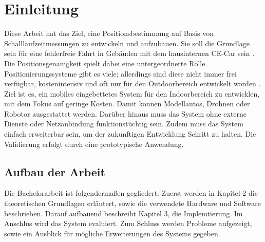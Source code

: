 \newpage
\section{Einleitung}

Diese Arbeit hat das Ziel, eine Positionsbestimmung auf Basis von Schalllaufzeitmessungen zu entwickeln und aufzubauen. Sie soll die Grundlage sein für eine fehlerfreie Fahrt in Gebäuden mit dem hausinternen CE-Car sein \cite{src_CE_CAR}. Die Positionsgenauigkeit spielt dabei eine untergeordnerte Rolle. Positionierungssysteme gibt es viele; allerdings sind diese nicht immer frei verfügbar, kostenintensiv und oft nur für den Outdoorbereich entwickelt worden \cite{src_INDOOR_OUTDOOR}. Ziel ist es, ein mobiles eingebettetes System für den Indoorbereich zu entwicklen, mit dem Fokus auf geringe Kosten. Damit können Modellautos, Drohnen oder Robotor ausgestattet werden. Darüber hinaus muss das System ohne externe Dienste oder Netzanbindung funktionstüchtig sein. Zudem muss das System einfach erweiterbar sein, um der zukunftigen Entwicklung Schritt zu halten. Die Validierung erfolgt durch eine prototypische Anwendung.

\subsection{Aufbau der Arbeit}
Die Bachelorarbeit ist folgendermaßen gegliedert: Zuerst werden in Kapitel 2 die theoretischen Grundlagen erläutert, sowie die verwendete Hardware und Software beschrieben. Darauf aufbauend beschreibt Kapitel 3, die Implemtierung. Im Anschlus wird das System evaluiert. Zum Schluss werden Probleme aufgezeigt, sowie ein Ausblick für mögliche Erweiterungen des Systems gegeben.
